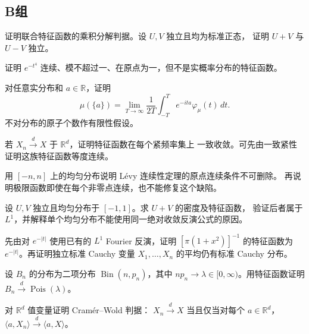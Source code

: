 \subsection*{B组}
\begin{enumerate}[label=\textbf{\thechapter.\arabic*.},resume]
证明联合特征函数的乘积分解判据。设 $U,V$ 独立且均为标准正态，
证明 $U+V$ 与 $U-V$ 独立。

证明 $e^{-t^4}$ 连续、模不超过一、在原点为一，但不是实概率分布的特征函数。

对任意实分布和 $a\in\mathbb R$，证明
\[
 \mu(\{a\})=\lim_{T\to\infty}\frac1{2T}\int_{-T}^{T}e^{-ita}\varphi_\mu(t)\,dt.
\]
不对分布的原子个数作有限性假设。

若 $X_n\xrightarrow dX$ 于 $\mathbb R^d$，证明特征函数在每个紧频率集上
一致收敛。可先由一致紧性证明这族特征函数等度连续。

用 $[-n,n]$ 上的均匀分布说明 Lévy 连续性定理的原点连续条件不可删除。
再说明极限函数即使在每个非零点连续，也不能修复这个缺陷。

设 $U,V$ 独立且均匀分布于 $[-1,1]$。求 $U+V$ 的密度及特征函数，
验证后者属于 $L^1$，并解释单个均匀分布不能使用同一绝对收敛反演公式的原因。

先由对 $e^{-|t|}$ 使用已有的 $L^1$ Fourier 反演，证明
$[\pi(1+x^2)]^{-1}$ 的特征函数为 $e^{-|t|}$。再证明独立标准 Cauchy
变量 $X_1,\ldots,X_n$ 的平均仍有标准 Cauchy 分布。

设 $B_n$ 的分布为二项分布 $\operatorname{Bin}(n,p_n)$，其中
$np_n\to\lambda\in[0,\infty)$。用特征函数证明
$B_n\xrightarrow d\operatorname{Pois}(\lambda)$。

对 $\mathbb R^d$ 值变量证明 Cramér--Wold 判据：
$X_n\xrightarrow dX$ 当且仅当对每个 $a\in\mathbb R^d$，
$\langle a,X_n\rangle\xrightarrow d\langle a,X\rangle$。
\end{enumerate}

